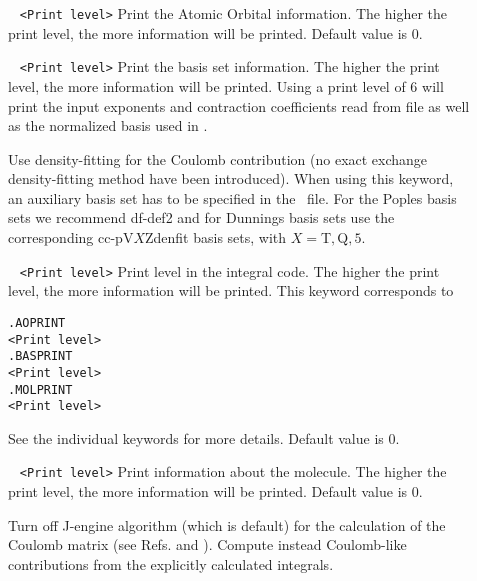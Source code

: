 \begin{description}
\item[] 
\verb| | \newline
\verb|<Print level>|\newline
Print the Atomic Orbital information. The higher the print level, the more information will be printed. Default value is 0.
\item[] 
\verb| | \newline
\verb|<Print level>|\newline
Print the basis set information. The higher the print level, the more information will be printed.
Using a print level of 6 will print the input exponents and contraction coefficients read from file as well as the normalized basis used in \lsdalton.  
\item[] Use density-fitting for the Coulomb contribution (no exact exchange density-fitting method have been introduced). 
When using this keyword, an auxiliary basis set has to be 
specified in the \mol\ file. For the Poples basis sets we recommend df-def2 and for
Dunnings basis sets use the corresponding cc-pV$X$Zdenfit basis sets, with $X=$T$,$Q$,5$.
\item[] 
\verb| | \newline
\verb|<Print level>|\newline
Print level in the integral code. The higher the print level, the more information will be printed. This keyword corresponds to 
\begin{verbatim}
.AOPRINT
<Print level>
.BASPRINT
<Print level>
.MOLPRINT
<Print level>
\end{verbatim} 
See the individual keywords for more details. Default value is 0.
\item[] 
\verb| | \newline
\verb|<Print level>|\newline
Print information about the molecule. The higher the print level, the more information will be printed. Default value is 0.
\item[] Turn off J-engine algorithm (which is default) for the calculation of the Coulomb matrix 
(see Refs. \cite{shao:425} and \cite{shao:6572}). Compute instead Coulomb-like contributions from the explicitly calculated integrals.

\end{description}
